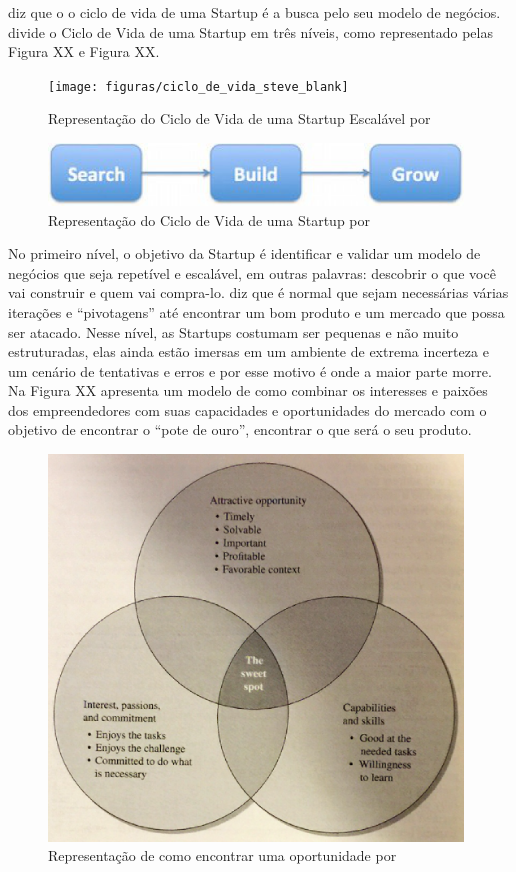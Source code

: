  diz que o o ciclo de vida de uma Startup é a busca pelo seu modelo de negócios.  divide o Ciclo de Vida de uma Startup em três níveis, como representado pelas Figura XX e Figura XX.

\begin{figure}[!htb]
\centering
\texttt{[image: figuras/ciclo\_de\_vida\_steve\_blank]}
\caption{Representação do Ciclo de Vida de uma Startup Escalável por \cite{Blank2014}}
\label{Rotulo}
\end{figure}

\begin{figure}[!htb]
\centering
\includegraphics[width=11cm,angle=0]{figuras/ciclo_de_vida_steve_blank02}
\caption{Representação do Ciclo de Vida de uma Startup por \cite{Blank2015}}
\label{Rotulo}
\end{figure}

No primeiro nível, o objetivo da Startup é identificar e validar um modelo de negócios que seja repetível e escalável, em outras palavras: descobrir o que você vai construir e quem vai compra-lo.  diz que é normal que sejam necessárias várias iterações e ``pivotagens'' até encontrar um bom produto e um mercado que possa ser atacado. Nesse nível, as Startups costumam ser pequenas e não muito estruturadas, elas ainda estão imersas em um ambiente de extrema incerteza e um cenário de tentativas e erros e por esse motivo é onde a maior parte morre. Na Figura XX  apresenta um modelo de como combinar os interesses e paixões dos empreendedores com suas capacidades e oportunidades do mercado com o objetivo de encontrar o ``pote de ouro'', encontrar o que será o seu produto.

\begin{figure}[!htb]
\centering
\includegraphics[width=11cm,angle=0]{figuras/the_sweet_spot_byers}
\caption{Representação de como encontrar uma oportunidade por \cite{Byers2014}}
\label{Rotulo}
\end{figure}

